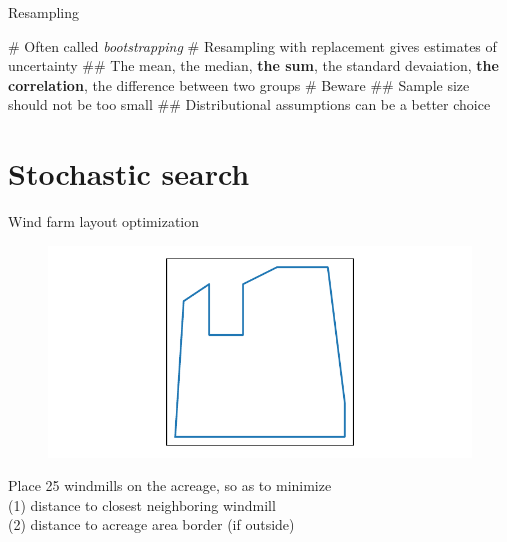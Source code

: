 \documentclass[12pt, aspectratio=149]{beamer}
\theoremstyle{plain}
\begin{document}
\begin{frame}[fragile]{Resampling}
	
	\begin{easylist}[itemize]
		# Often called \emph{bootstrapping}
		# Resampling with replacement gives estimates of uncertainty
		## The mean, the median, \textbf{the sum}, the standard devaiation, \textbf{the correlation}, the difference between two groups
		# Beware
		## Sample size should not be too small
		## Distributional assumptions can be a better choice
	\end{easylist}
\end{frame}


\section{Stochastic search}

\begin{frame}[fragile]{Wind farm layout optimization}
\vspace*{-1em}
\begin{center}
 \begin{figure}
    	\centering
    	\includegraphics[width=0.99\linewidth]{figures/windfarm}
 \end{figure}
 \end{center}
\vspace*{-2em}
\begin{center}
Place 25 windmills on the acreage, so as to minimize \\
(1) distance to closest neighboring windmill \\
(2) distance to acreage area border (if outside)
\end{center}
\end{frame}
\end{document}

